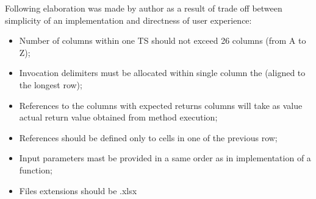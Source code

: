 Following elaboration was made by author as a result of trade off between simplicity of an implementation and directness of user experience:
\begin{itemize}
\item Number of columns within one TS should not exceed 26 columns (from A to Z);
\item Invocation delimiters must be allocated within single column the (aligned to the longest row);
\item References to the columns with expected returns columns will take as value actual return value obtained from method execution;
\item References should be defined only to cells in one of the previous row;
\item Input parameters mast be provided in a same order as in implementation of a function;
\item Files extensions should be .xlsx
\end{itemize}





